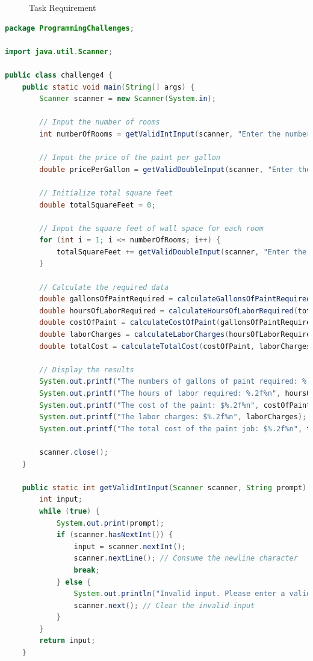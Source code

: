 \documentclass{article}
\begin{document}
\begin{figure}[h]
    \centering
    \caption{Task Requirement}
\end{figure}

\begin{lstlisting}[language=Java, caption=Challenge4.java]
package ProgrammingChallenges;

import java.util.Scanner;

public class challenge4 {
    public static void main(String[] args) {
        Scanner scanner = new Scanner(System.in);

        // Input the number of rooms
        int numberOfRooms = getValidIntInput(scanner, "Enter the number of rooms to be painted: ");

        // Input the price of the paint per gallon
        double pricePerGallon = getValidDoubleInput(scanner, "Enter the price of the paint per gallon: ");

        // Initialize total square feet
        double totalSquareFeet = 0;

        // Input the square feet of wall space for each room
        for (int i = 1; i <= numberOfRooms; i++) {
            totalSquareFeet += getValidDoubleInput(scanner, "Enter the square feet of wall space for room " + i + ": ");
        }

        // Calculate the required data
        double gallonsOfPaintRequired = calculateGallonsOfPaintRequired(totalSquareFeet);
        double hoursOfLaborRequired = calculateHoursOfLaborRequired(totalSquareFeet);
        double costOfPaint = calculateCostOfPaint(gallonsOfPaintRequired, pricePerGallon);
        double laborCharges = calculateLaborCharges(hoursOfLaborRequired);
        double totalCost = calculateTotalCost(costOfPaint, laborCharges);

        // Display the results
        System.out.printf("The numbers of gallons of paint required: %.2f%n", gallonsOfPaintRequired);
        System.out.printf("The hours of labor required: %.2f%n", hoursOfLaborRequired);
        System.out.printf("The cost of the paint: $%.2f%n", costOfPaint);
        System.out.printf("The labor charges: $%.2f%n", laborCharges);
        System.out.printf("The total cost of the paint job: $%.2f%n", totalCost);

        scanner.close();
    }

    public static int getValidIntInput(Scanner scanner, String prompt) {
        int input;
        while (true) {
            System.out.print(prompt);
            if (scanner.hasNextInt()) {
                input = scanner.nextInt();
                scanner.nextLine(); // Consume the newline character
                break;
            } else {
                System.out.println("Invalid input. Please enter a valid integer.");
                scanner.next(); // Clear the invalid input
            }
        }
        return input;
    }


\end{lstlisting}
\end{document}
